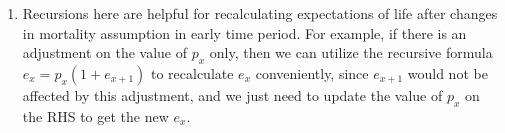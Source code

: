 \begin{enumerate}
we derive the recursive formulas, namely by ``splitting'' the terms and
factoring out some constants. For example:
\begin{align*}
e_x&=\vc{e_{\endowxn}}+\brc{\px[n+1]{x}+\px[n+2]{x}+\px[n+3]{x}+\dotsb} \\
&=\vc{e_{\endowxn}}+\brc{\gc{\px[n]{x}}\times \px{x+n}
+\gc{\px[n]{x}}\times \px[2]{x+n}
+\gc{\px[n]{x}}\times \px[3]{x+n}+\dotsb} \\
&=\vc{e_{\endowxn}}+\brc{\gc{\px[n]{x}}(\px{x+n}+\px[2]{x+n}+\px[3]{x+n}+\dotsb)} \\
&=\vc{e_{\endowxn}}+\underbrace{\gc{\px[n]{x}}}_{\mathclap{\text{``like'' discounting factor}}}\brc{e_{x+n}}. \\
\end{align*}

\item Recursions here are helpful for recalculating expectations of life after
changes in mortality assumption in early time period. For example, if there is
an adjustment on the value of \(p_x\) only, then we can utilize the recursive
formula \(e_x=p_x(1+e_{x+1})\) to recalculate \(e_x\) conveniently, since
\(e_{x+1}\) would not be affected by this adjustment, and we just need to
update the value of \(p_x\) on the RHS to get the new \(e_x\).
\end{enumerate}
